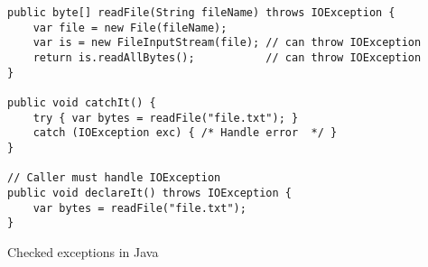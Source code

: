 \begin{algorithm}

\begin{verbatim}
public byte[] readFile(String fileName) throws IOException {
    var file = new File(fileName);
    var is = new FileInputStream(file); // can throw IOException
    return is.readAllBytes();           // can throw IOException
}

public void catchIt() {
    try { var bytes = readFile("file.txt"); }
    catch (IOException exc) { /* Handle error  */ }
}

// Caller must handle IOException
public void declareIt() throws IOException {
    var bytes = readFile("file.txt");
}
\end{verbatim}

\caption{Checked exceptions in Java \label{java-checked-exc}}
\end{algorithm}